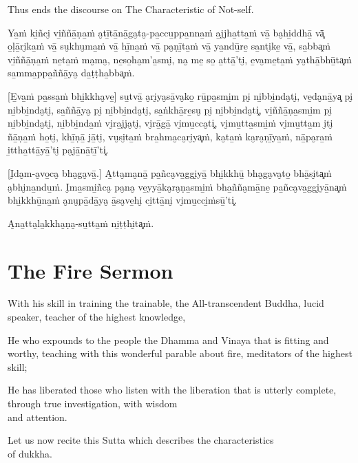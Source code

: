 Thus ends the discourse on The Characteristic of Not-self.

\clearpage

\paliText
\markboth{\paliTitle}{\rightmark}

Ya̱ṁ ki̱ñci̮ vi̱ññā̱ṇa̱ṁ a̮tī̱tā̱nā̱ga̮ta̮-pa̱ccu̱ppa̱nna̱ṁ a̱jjha̱tta̱ṁ vā̱ ba̮hi̱ddhā̱ vā͓
o̱ḷā̱ri̮ka̱ṁ vā̱ su̮khu̮ma̱ṁ vā̱ hī̱na̱ṁ vā̱ pa̮ṇī̱ta̱ṁ vā̱ ya̱ndū̱re̱ sa̱nti̮ke̱ vā̱, sa̱bba͓ṁ
vi̱ññā̱ṇa̱ṁ ne̱ta̱ṁ ma̮ma̮, ne̱so̱ha̮m'a̱smi̮, na̮ me̱ so̱ a̱ttā̱'ti̮, e̱va̮me̱ta̱ṁ ya̮thā̱bhū̱ta͓ṁ
sa̱mma̱ppa̱ññā̱ya̮ da̱ṭṭha̱bba͓ṁ.

[E̱va̱ṁ pa̱ssa̱ṁ bhi̱kkha̮ve̱] su̱tvā̱ a̮ri̮ya̮sā̱va̮ko̱ rū̱pa̱smi̱m pi̮ ni̱bbi̱nda̮ti̮, ve̱da̮nā̱ya͓
pi̮ ni̱bbi̱nda̮ti̮, sa̱ññā̱ya̮ pi̮ ni̱bbi̱nda̮ti̮, sa̱ṅkhā̱re̱su̮ pi̮ ni̱bbi̱nda̮ti͓,
vi̱ññā̱ṇa̱smi̱m pi̮ ni̱bbi̱nda̮ti̮, ni̱bbi̱nda̱ṁ vi̮ra̱jja̮ti̮, vi̮rā̱gā̱ vi̮mu̱cca̮ti͓,
vi̮mu̱tta̱smi̱ṁ vi̮mu̱tta̱m i̮ti̮ ñā̱ṇa̱ṁ ho̱ti̮, khī̱ṇā̱ jā̱ti̮, vu̮si̮ta̱ṁ bra̱hma̮ca̮ri̮ya͓ṁ,
ka̮ta̱ṁ ka̮ra̮ṇī̱ya̱ṁ, nā̱pa̮ra̱ṁ i̱ttha̱ttā̱yā̱'ti̮ pa̮jā̱nā̱tī̱'ti͓.

[I̮da̮m-a̮vo̱ca̮ bha̮ga̮vā̱.] A̱tta̮ma̮nā̱ pa̱ñca̮va̱ggi̮yā̱ bhi̱kkhū̱ bha̮ga̮va̮to̱ bhā̱si̮ta͓ṁ
a̮bhi̮na̱ndu̱ṁ. I̮ma̱smi̱ñca̮ pa̮na̮ ve̱yyā̱ka̮ra̮ṇa̱smi̱ṁ bha̱ñña̮mā̱ne̱ pa̱ñca̮va̱ggi̮yā̱na͓ṁ
bhi̱kkhū̱na̱ṁ a̮nu̮pā̱dā̱ya̮ ā̱sa̮ve̱hi̮ ci̱ttā̱ni̮ vi̮mu̱cci̱ṁsū̱'ti͓.

A̮na̱tta̮la̱kkha̮ṇa̮-su̱tta̱ṁ ni̱ṭṭhi̮ta͓ṁ.

\chapterTocDelegatePageNumber
\chapter{The Fire Sermon}

\setTocDelegatedPageNumber
\englishText
\renewcommand{\englishTitle}{The Fire Sermon}

\begin{leader}

With his skill in training the trainable, the All-transcendent Buddha,
lucid speaker, teacher of the highest knowledge,

He who expounds to the people the Dhamma and Vinaya that is fitting and
worthy, teaching with this wonderful parable about fire, meditators of
the highest skill;

He has liberated those who listen with the liberation that is utterly
complete, through true investigation, with wisdom\\ and attention.

Let us now recite this Sutta which describes the characteristics\\ of dukkha.

\end{leader}

